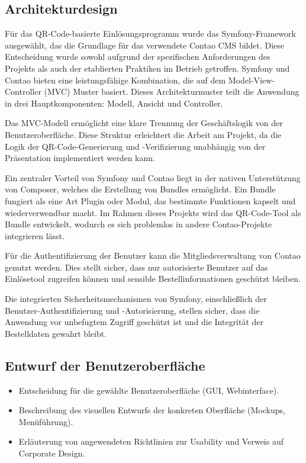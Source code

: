 \subsection{Architekturdesign}
\label{sec:Architekturdesign}

Für das QR-Code-basierte Einlösungsprogramm wurde das Symfony-Framework ausgewählt, das die Grundlage für das verwendete Contao CMS bildet. Diese Entscheidung wurde sowohl aufgrund der spezifischen Anforderungen des Projekts als auch der etablierten Praktiken im Betrieb getroffen. Symfony und Contao bieten eine leistungsfähige Kombination, die auf dem Model-View-Controller (MVC) Muster basiert. Dieses Architekturmuster teilt die Anwendung in drei Hauptkomponenten: Modell, Ansicht und Controller.

Das MVC-Modell ermöglicht eine klare Trennung der Geschäftslogik von der Benutzeroberfläche. Diese Struktur erleichtert die Arbeit am Projekt, da die Logik der QR-Code-Generierung und -Verifizierung unabhängig von der Präsentation implementiert werden kann.

Ein zentraler Vorteil von Symfony und Contao liegt in der nativen Unterstützung von Composer, welches die Erstellung von Bundles ermöglicht. Ein Bundle fungiert als eine Art Plugin oder Modul, das bestimmte Funktionen kapselt und wiederverwendbar macht. Im Rahmen dieses Projekts wird das QR-Code-Tool als Bundle entwickelt, wodurch es sich problemlos in andere Contao-Projekte integrieren lässt.

Für die Authentifizierung der Benutzer kann die Mitgliedsverwaltung von Contao genutzt werden. Dies stellt sicher, dass nur autorisierte Benutzer auf das Einlösetool zugreifen können und sensible Bestellinformationen geschützt bleiben.

Die integrierten Sicherheitsmechanismen von Symfony, einschließlich der Benutzer-Authentifizierung und -Autorisierung, stellen sicher, dass die Anwendung vor unbefugtem Zugriff geschützt ist und die Integrität der Bestelldaten gewahrt bleibt.


\subsection{Entwurf der Benutzeroberfläche}
\label{sec:Benutzeroberflaeche} 
\begin{itemize}
	\item Entscheidung für die gewählte Benutzeroberfläche (\zB GUI, Webinterface).
	\item Beschreibung des visuellen Entwurfs der konkreten Oberfläche (\zB Mockups, Menüführung).
	\item \Ggfs Erläuterung von angewendeten Richtlinien zur Usability und Verweis auf Corporate Design.
\end{itemize}


